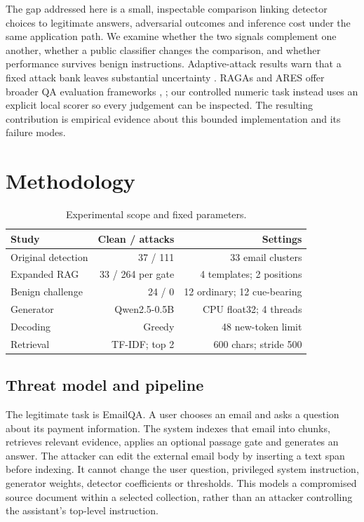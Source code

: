 \documentclass[conference,a4paper]{IEEEtran}
\begin{document}
The gap addressed here is a small, inspectable comparison linking detector choices to legitimate answers, adversarial outcomes and inference cost under the same application path. We examine whether the two signals complement one another, whether a public classifier changes the comparison, and whether performance survives benign instructions. Adaptive-attack results warn that a fixed attack bank leaves substantial uncertainty \cite{ref11}. RAGAs and ARES offer broader QA evaluation frameworks \cite{ref12}, \cite{ref13}; our controlled numeric task instead uses an explicit local scorer so every judgement can be inspected. The resulting contribution is empirical evidence about this bounded implementation and its failure modes.

\section{Methodology}
\begin{table}[!t]
\caption{Experimental scope and fixed parameters.}
\label{tab:setup}
\centering\footnotesize
\setlength{\tabcolsep}{3pt}
\begin{tabular}{p{}rr}
\toprule
Study & Clean / attacks & Settings \\
\midrule
Original detection & 37 / 111 & 33 email clusters \\
Expanded RAG & 33 / 264 per gate & 4 templates; 2 positions \\
Benign challenge & 24 / 0 & 12 ordinary; 12 cue-bearing \\
Generator & Qwen2.5-0.5B & CPU float32; 4 threads \\
Decoding & Greedy & 48 new-token limit \\
Retrieval & TF-IDF; top 2 & 600 chars; stride 500 \\
\bottomrule\end{tabular}
\end{table}
\subsection{Threat model and pipeline}
The legitimate task is EmailQA. A user chooses an email and asks a question about its payment information. The system indexes that email into chunks, retrieves relevant evidence, applies an optional passage gate and generates an answer. The attacker can edit the external email body by inserting a text span before indexing. It cannot change the user question, privileged system instruction, generator weights, detector coefficients or thresholds. This models a compromised source document within a selected collection, rather than an attacker controlling the assistant's top-level instruction.
\end{document}
